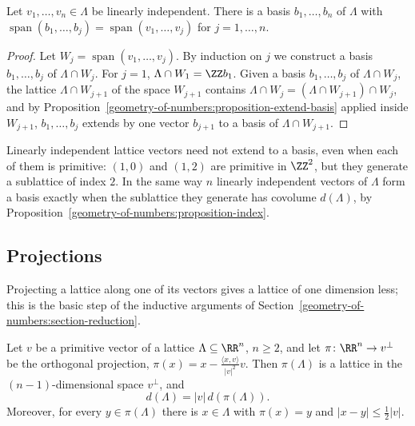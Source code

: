 \begin{corollary}\label{geometry-of-numbers:corollary-adapted-basis}
Let $v_1, \ldots, v_n \in \Lambda$ be linearly independent. There is a basis $b_1, \ldots, b_n$ of $\Lambda$ with $\operatorname{span}(b_1, \ldots, b_j) = \operatorname{span}(v_1, \ldots, v_j)$ for
$j = 1, \ldots, n$.
\end{corollary}

\begin{proof}
Let $W_j = \operatorname{span}(v_1, \ldots, v_j)$. By induction on $j$ we construct a basis $b_1, \ldots, b_j$ of $\Lambda \cap W_j$. For $j = 1$, $\Lambda \cap W_1 = \ZZ b_1$. Given a basis $b_1, \ldots, b_j$
of $\Lambda \cap W_j$, the lattice $\Lambda \cap W_{j+1}$ of the space $W_{j+1}$ contains $\Lambda \cap W_j = (\Lambda \cap W_{j+1}) \cap W_j$, and by
Proposition~\ref{geometry-of-numbers:proposition-extend-basis} applied inside $W_{j+1}$, $b_1, \ldots, b_j$ extends by one vector $b_{j+1}$ to a basis of $\Lambda \cap W_{j+1}$.
\end{proof}

\begin{counterexample}\label{geometry-of-numbers:counterexample-independent-not-basis}
Linearly independent lattice vectors need not extend to a basis, even when each of them is primitive: $(1, 0)$ and $(1, 2)$ are primitive in $\ZZ^2$, but they generate a sublattice of index $2$. In the
same way $n$ linearly independent vectors of $\Lambda$ form a basis exactly when the sublattice they generate has covolume $d(\Lambda)$, by Proposition~\ref{geometry-of-numbers:proposition-index}.
\end{counterexample}

\subsection{Projections}\label{geometry-of-numbers:subsection-projections}

Projecting a lattice along one of its vectors gives a lattice of one dimension less; this is the basic step of the inductive arguments of Section~\ref{geometry-of-numbers:section-reduction}.

\begin{lemma}\label{geometry-of-numbers:lemma-projection}
Let $v$ be a primitive vector of a lattice $\Lambda \subseteq \RR^n$, $n \geq 2$, and let $\pi \colon \RR^n \to v^\perp$ be the orthogonal projection, $\pi(x) = x - \frac{\langle x, v \rangle}{|v|^2}v$. Then
$\pi(\Lambda)$ is a lattice in the $(n - 1)$-dimensional space $v^\perp$, and
\[
d(\Lambda) = |v|\,d(\pi(\Lambda)).
\]
Moreover, for every $y \in \pi(\Lambda)$ there is $x \in \Lambda$ with $\pi(x) = y$ and $|x - y| \leq \frac12|v|$.
\end{lemma}


